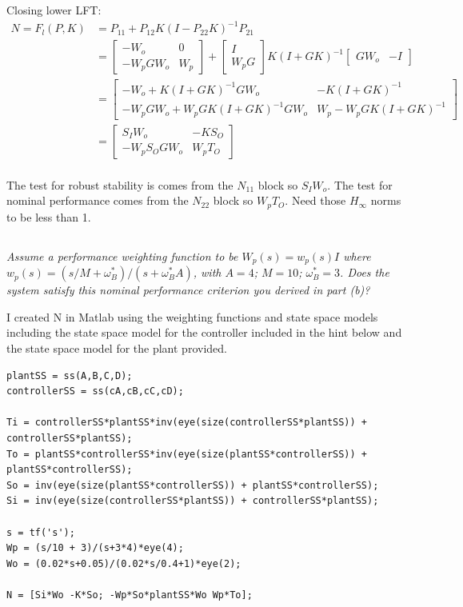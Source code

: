 \documentclass{article}
\begin{document}
Closing lower LFT:
\begin{align*}
    N = F_l(P,K) &= P_{11} + P_{12} K (I - P_{22} K)^{-1} P_{21} \\
    &= \begin{bmatrix} -W_o & 0 \\ -W_p G W_o & W_p \end{bmatrix} + \begin{bmatrix} I \\ W_p G \end{bmatrix} K (I + G K)^{-1} \begin{bmatrix} G W_o & -I \end{bmatrix} \\
    &= \begin{bmatrix} -W_o + K (I + G K)^{-1} G W_o & -K (I + G K)^{-1} \\ -W_p G W_o + W_p G K (I + G K)^{-1} G W_o & W_p - W_p G K (I + G K)^{-1} \end{bmatrix} \\
    &= \begin{bmatrix} S_I W_o & -K S_O \\ -W_p S_O G W_o & W_p T_O \end{bmatrix} \\
\end{align*}

The test for robust stability is comes from the $N_{11}$ block so $S_I W_o$.
The test for nominal performance comes from the $N_{22}$ block so $W_p T_O$.
Need those $H_\infty$ norms to be less than 1.

\subsection{} 
\textit{Assume a performance weighting function to be $W_p(s) = w_p(s) I$ where $w_p(s) = (s / M + \omega_B^*)/(s + \omega_B^* A)$, with $A = 4$; $M = 10$; $\omega_B^* = 3$. Does the system satisfy this nominal performance criterion you derived in part (b)?}

I created N in Matlab using the weighting functions and state space models including the state space model for the controller included in the hint below and the state space model for the plant provided.

\begin{lstlisting}[style=matlabstyle]
plantSS = ss(A,B,C,D);
controllerSS = ss(cA,cB,cC,cD);

Ti = controllerSS*plantSS*inv(eye(size(controllerSS*plantSS)) + controllerSS*plantSS);
To = plantSS*controllerSS*inv(eye(size(plantSS*controllerSS)) + plantSS*controllerSS);
So = inv(eye(size(plantSS*controllerSS)) + plantSS*controllerSS);
Si = inv(eye(size(controllerSS*plantSS)) + controllerSS*plantSS);

s = tf('s');
Wp = (s/10 + 3)/(s+3*4)*eye(4);
Wo = (0.02*s+0.05)/(0.02*s/0.4+1)*eye(2);

N = [Si*Wo -K*So; -Wp*So*plantSS*Wo Wp*To];    
\end{lstlisting}
\end{document}
